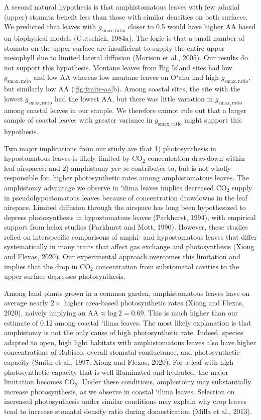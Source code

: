 \documentclass[
  letterpaper,
  DIV=11,
  numbers=noendperiod]{scrartcl}
\begin{document}
A second natural hypothesis is that amphistomatous leaves with few
adaxial (upper) stomata benefit less than those with similar densities
on both surfaces. We predicted that leaves with
\(g_\mathrm{smax,ratio}\) closer to 0.5 would have higher
\(\mathrm{AA}\) based on biophysical models (Gutschick, 1984a). The
logic is that a small number of stomata on the upper surface are
insufficient to supply the entire upper mesophyll due to limited lateral
diffusion (Morison et al., 2005). Our results do not support this
hypothesis. Montane leaves from Big Island sites had low
\(g_\mathrm{smax,ratio}\) and low \(\mathrm{AA}\) whereas low montane
leaves on Oʻahu had high \(g_\mathrm{smax,ratio}\), but similarly low
\(\mathrm{AA}\) (\autoref{fig:traits-aa}b). Among coastal sites, the
site with the lowest \(g_\mathrm{smax,ratio}\) had the lowest
\(\mathrm{AA}\), but there was little variation in
\(g_\mathrm{smax,ratio}\) among coastal leaves in our sample. We
therefore cannot rule out that a larger sample of coastal leaves with
greater variance in \(g_\mathrm{smax,ratio}\) might support this
hypothesis.

Two major implications from our study are that 1) photosynthesis in
hypostomatous leaves is likely limited by CO\(_2\) concentration
drawdown within leaf airspaces; and 2) amphistomy \emph{per se}
contributes to, but is not wholly responsible for, higher photosynthetic
rates among amphistomatous leaves. The amphistomy advantage we observe
in ʻilima leaves implies decreased CO\(_2\) supply in
pseudohypostomatous leaves because of concentration drawdowns in the
leaf airspace. Limited diffusion through the airspace has long been
hypothesized to depress photosynthesis in hypostomatous leaves
(Parkhurst, 1994), with empirical support from helox studies (Parkhurst
and Mott, 1990). However, these studies relied on interspecific
comparisons of amphi- and hypostomatous leaves that differ
systematically in many traits that affect gas exchange and
photosynthesis (Xiong and Flexas, 2020). Our experimental approach
overcomes this limitation and implies that the drop in CO\(_2\)
concentration from substomatal cavities to the upper surface depresses
photosynthesis.

Among land plants grown in a common garden, amphistomatous leaves have
on average nearly \(2\times\) higher area-based photosynthetic rates
(Xiong and Flexas, 2020), naively implying an
\(\mathrm{AA} \approx \text{log}~2 = 0.69\). This is much higher than
our estimate of 0.12 among coastal ʻilima leaves. The most likely
explanation is that amphistomy is not the only cause of high
photosynthetic rate. Indeed, species adapted to open, high light
habitats with amphistomatous leaves also have higher concentrations of
Rubisco, overall stomatal conductance, and photosynthetic capacity
(Smith et al., 1997; Xiong and Flexas, 2020). For a leaf with high
photosynthetic capacity that is well illuminated and hydrated, the major
limitation becomes CO\(_2\). Under these conditions, amphistomy may
substantially increase photosynthesis, as we observe in coastal ʻilima
leaves. Selection on increased photosynthesis under similar conditions
may explain why crop leaves tend to increase stomatal density ratio
during domestication (Milla et al., 2013).
\end{document}
